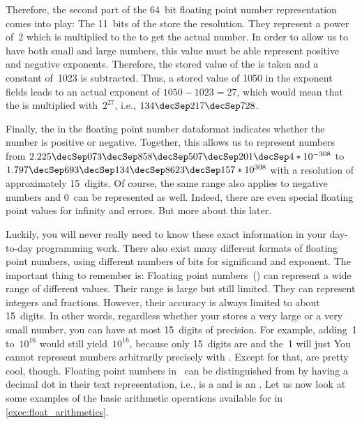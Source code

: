 Therefore, the second part of the 64~bit floating point number representation comes into play:
The 11~bits of the  store the resolution.
They represent a power of~2 which is multiplied to the  to get the actual number.
In order to allow us to have both small and large numbers, this value must be able represent positive and negative exponents.
Therefore, the stored value of the  is taken and a constant  of~1023 is subtracted.
Thus, a stored value of 1050 in the exponent fields leads to an actual exponent of $1050-1023=27$, which would mean that the  is multiplied with~$2^{27}$, i.e., $134\decSep217\decSep728$.%
%
\begin{sloppypar}%
Finally, the  in the floating point number dataformat indicates whether the number is positive or negative.
Together, this allows us to represent numbers from $2.225\decSep073\decSep858\decSep507\decSep201\decSep4*10^{-308}$ to $1.797\decSep693\decSep134\decSep8623\decSep157*10^{308}$ with a resolution of approximately 15~digits.
Of course, the same range also applies to negative numbers and $0$~can be represented as well.
Indeed, there are even special floating point values for infinity and errors.
But more about this later.%
\end{sloppypar}%
%
Luckily, you will never really need to know these exact information in your day-to-day programming work.
There also exist many different formats of floating point numbers, using different numbers of bits for significand and exponent.
The important thing to remember is:
Floating point numbers~() can represent a wide range of different values.
Their range is large but still limited.
They can represent integers and fractions.
However, their accuracy is always limited to about 15~digits.
In other words, regardless whether your  stores a very large or a very small number, you can have at most 15~digits of precision.
For example, adding~1 to~$10^{16}$ would still yield~$10^{16}$, because only 15~digits are  and the~1 will just 
You cannot represent numbers arbitrarily precisely with .
Except for that,  are pretty cool, though.%
%
%
\endhsection%
%
%
\label{sec:floatarith}%
%
%
%
%
Floating point numbers in \python\ can be distinguished from  by having a decimal dot in their text representation, i.e.,  is a  and  is an .
Let us now look at some examples of the basic arithmetic operations available for  in \cref{exec:float_arithmetics}.

